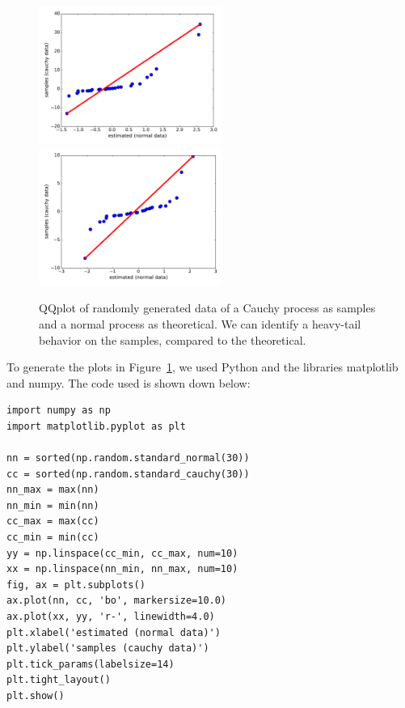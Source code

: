 \begin{figure}[t!]
    \centering
        \includegraphics[width=60mm]{figures/apA/qq-c1}
    \hspace{0mm}
        \includegraphics[width=60mm]{figures/apA/qq-c2}
    \caption{QQplot of randomly generated data of a Cauchy process as samples and a normal process as theoretical. We can identify a heavy-tail behavior on the samples, compared to the theoretical.}
    \label{fig:qq-cauchy}
\end{figure}



To generate the plots in Figure~\ref{fig:qq-cauchy}, we used Python and the libraries matplotlib and numpy. The code used is shown down below: 


\begin{verbatim}
import numpy as np
import matplotlib.pyplot as plt

nn = sorted(np.random.standard_normal(30))
cc = sorted(np.random.standard_cauchy(30))
nn_max = max(nn)
nn_min = min(nn)
cc_max = max(cc)
cc_min = min(cc)
yy = np.linspace(cc_min, cc_max, num=10)
xx = np.linspace(nn_min, nn_max, num=10)
fig, ax = plt.subplots()
ax.plot(nn, cc, 'bo', markersize=10.0)
ax.plot(xx, yy, 'r-', linewidth=4.0)
plt.xlabel('estimated (normal data)')
plt.ylabel('samples (cauchy data)')
plt.tick_params(labelsize=14)
plt.tight_layout()
plt.show()
\end{verbatim}



